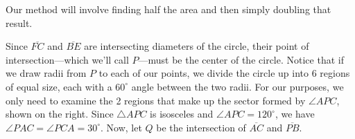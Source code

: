 \begin{solution}[$\sqrt{3}/4$]\raggedright
    Our method will involve finding half the area and then simply doubling that result.
    \begin{minipage}[t]{0.76\linewidth}\vspace{0pt}
        Since $\overline{FC}$ and $\overline{BE}$ are intersecting diameters of the circle, their point of intersection---which we'll call $P$---must be the center of the circle. Notice that if we draw radii from $P$ to each of our points, we divide the circle up into 6 regions of equal size, each with a $60^\circ$ angle between the two radii. For our purposes, we only need to examine the 2 regions that make up the sector formed by $\angle APC$, shown on the right. Since $\triangle APC$ is isosceles and $\angle APC = 120^\circ$, we have $\angle PAC = \angle PCA = 30^\circ$. Now, let $Q$ be the intersection of $\overline{AC}$ and $\overline{PB}$.
    \end{minipage}\hfill
    \begin{minipage}[t]{0.2\linewidth}\vspace{0pt}
        \hfill{}
\end{minipage}
\end{solution}
